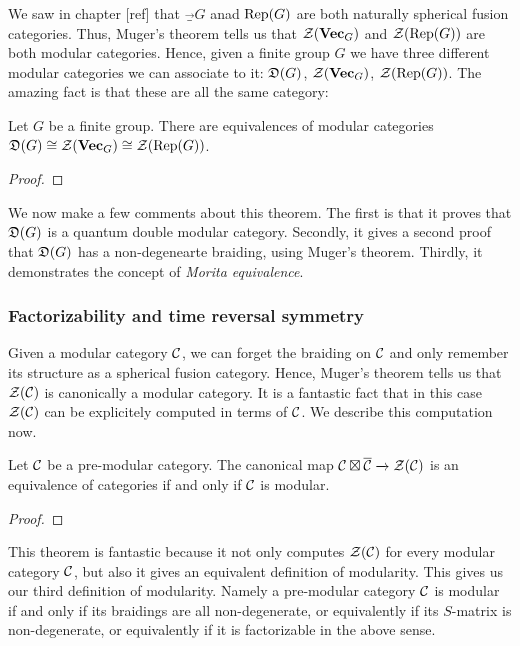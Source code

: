 We saw in chapter [ref] that $\Vec_G$ anad $\operatorname{Rep}(G)$ are both naturally spherical fusion categories. Thus, Muger's theorem tells us that ${\mathcal Z}({\bf Vec}_G)$ and ${\mathcal Z}(\operatorname{Rep}(G))$ are both modular categories. Hence, given a finite group $G$ we have three different modular categories we can associate to it: ${\mathfrak D}(G)$, ${\mathcal Z}({\bf Vec}_G)$, ${\mathcal Z}(\operatorname{Rep}(G))$. The amazing fact is that these are all the same category:

\begin{prop} Let $G$ be a finite group. There are equivalences of modular categories ${\mathfrak D}(G)\cong {\mathcal Z}({\bf Vec}_G)\cong {\mathcal Z}(\operatorname{Rep}(G))$.
\end{prop}
\begin{proof}
\end{proof}

We now make a few comments about this theorem. The first is that it proves that ${\mathfrak D}(G)$ is a quantum double modular category. Secondly, it gives a second proof that ${\mathfrak D}(G)$ has a non-degenearte braiding, using Muger's theorem. Thirdly, it demonstrates the concept of \textit{Morita equivalence}.


\subsubsection{Factorizability and time reversal symmetry}

Given a modular category ${\mathcal C}$, we can forget the braiding on ${\mathcal C}$ and only remember its structure as a spherical fusion category. Hence, Muger's theorem tells us that ${\mathcal Z}({\mathcal C})$ is canonically a modular category. It is a fantastic fact that in this case ${\mathcal Z}({\mathcal C})$ can be explicitely computed in terms of ${\mathcal C}$. We describe this computation now.


\begin{prop} Let ${\mathcal C}$ be a pre-modular category. The canonical map ${\mathcal C}\boxtimes \overline{{\mathcal C}}\xrightarrow{}{\mathcal Z}({\mathcal C})$ is an equivalence of categories if and only if ${\mathcal C}$ is modular.
\end{prop}
\begin{proof}
\end{proof}

This theorem is fantastic because it not only computes ${\mathcal Z}({\mathcal C})$ for every modular category ${\mathcal C}$, but also it gives an equivalent definition of modularity. This gives us our third definition of modularity. Namely a pre-modular category ${\mathcal C}$ is modular if and only if its braidings are all non-degenerate, or equivalently if its $S$-matrix is non-degenerate, or equivalently if it is factorizable in the above sense.

